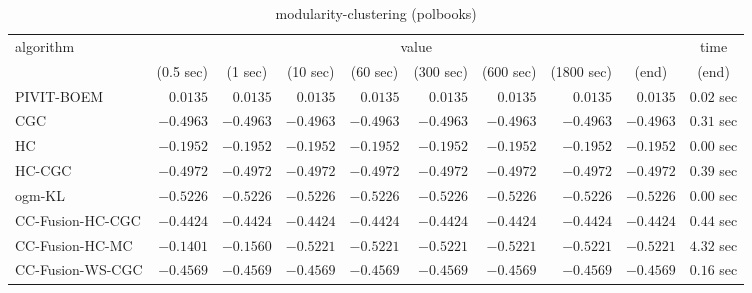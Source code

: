 \begin{table}[H]
\scriptsize
\centering
\caption{modularity-clustering (polbooks)}
\label{tab:anytimetable-modularity-clustering-polbooks}
\begin{tabular}{lrrrrrrrrr}
\toprule
           algorithm &                                   \multicolumn{8}{c}{value} & \multicolumn{1}{c}{time}   \\  
\cmidrule(lr){2-9}\cmidrule(lr){10-10}   
                     & \multicolumn{1}{c}{(0.5 sec)} & \multicolumn{1}{c}{(1 sec)} & \multicolumn{1}{c}{(10 sec)} & \multicolumn{1}{c}{(60 sec)} & \multicolumn{1}{c}{(300 sec)} & \multicolumn{1}{c}{(600 sec)} & \multicolumn{1}{c}{(1800 sec)} & \multicolumn{1}{c}{(end)} & \multicolumn{1}{c}{(end)}   \\ \midrule 
          PIVIT-BOEM & $       0.0135$ & $       0.0135$ & $       0.0135$ & $       0.0135$ & $       0.0135$ & $       0.0135$ & $       0.0135$ & $       0.0135$ & $         0.02$ sec   \\ 
                 CGC & $      -0.4963$ & $      -0.4963$ & $      -0.4963$ & $      -0.4963$ & $      -0.4963$ & $      -0.4963$ & $      -0.4963$ & $      -0.4963$ & $         0.31$ sec   \\ 
                  HC & $      -0.1952$ & $      -0.1952$ & $      -0.1952$ & $      -0.1952$ & $      -0.1952$ & $      -0.1952$ & $      -0.1952$ & $      -0.1952$ & $         0.00$ sec   \\ 
              HC-CGC & $      -0.4972$ & $      -0.4972$ & $      -0.4972$ & $      -0.4972$ & $      -0.4972$ & $      -0.4972$ & $      -0.4972$ & $      -0.4972$ & $         0.39$ sec   \\ 
              ogm-KL & $      -0.5226$ & $      -0.5226$ & $      -0.5226$ & $      -0.5226$ & $      -0.5226$ & $      -0.5226$ & $      -0.5226$ & $      -0.5226$ & $         0.00$ sec   \\ 
    CC-Fusion-HC-CGC & $      -0.4424$ & $      -0.4424$ & $      -0.4424$ & $      -0.4424$ & $      -0.4424$ & $      -0.4424$ & $      -0.4424$ & $      -0.4424$ & $         0.44$ sec   \\ 
     CC-Fusion-HC-MC & $      -0.1401$ & $      -0.1560$ & $      -0.5221$ & $      -0.5221$ & $      -0.5221$ & $      -0.5221$ & $      -0.5221$ & $      -0.5221$ & $         4.32$ sec   \\ 
    CC-Fusion-WS-CGC & $      -0.4569$ & $      -0.4569$ & $      -0.4569$ & $      -0.4569$ & $      -0.4569$ & $      -0.4569$ & $      -0.4569$ & $      -0.4569$ & $         0.16$ sec   \\ 

\end{tabular}
\end{table}
